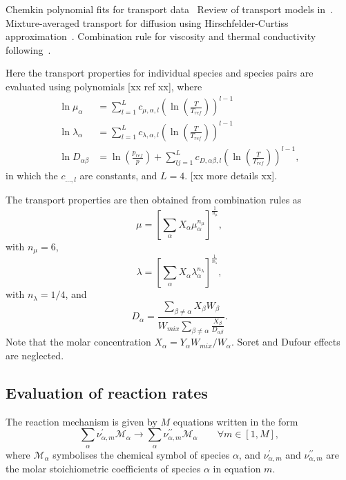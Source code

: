 \documentclass[notitlepage]{revtex4-1}
\begin{document}
Chemkin polynomial fits for transport data~\cite{kee_1986}
Review of transport models in~\cite{giacomazzi_2008}.
Mixture-averaged transport for diffusion using Hirschfelder-Curtiss approximation~\cite{hirschfelder_curtiss}.
Combination rule for viscosity and thermal conductivity following~\cite{ern_1994,ern_1995}.

Here the transport properties for individual species and species pairs are evaluated using polynomials [xx ref xx], where
\begin{subequations}\begin{align}
\ln\mu_{\alpha}&=\displaystyle\sum_{l=1}^{L}c_{\mu,\alpha,l}\left(\ln\left(\frac{T}{T_{ref}}\right)\right)^{l-1}\\
\ln\lambda_{\alpha}&=\displaystyle\sum_{l=1}^{L}c_{\lambda,\alpha,l}\left(\ln\left(\frac{T}{T_{ref}}\right)\right)^{l-1}\\
\ln{D}_{\alpha\beta}&=\ln\left(\frac{p_{ref}}{p}\right)+\displaystyle\sum_{lj=1}^{L}c_{D,\alpha\beta,l}\left(\ln\left(\frac{T}{T_{ref}}\right)\right)^{l-1},
\end{align}\end{subequations}
in which the $c_{\dots,l}$ are constants, and $L=4$. [xx more details xx].

The transport properties are then obtained from combination rules as
\begin{equation}\mu=\left[\displaystyle\sum_{\alpha}X_{\alpha}\mu_{\alpha}^{n_{\mu}}\right]^{\frac{1}{n_{\mu}}},\end{equation}
with $n_{\mu}=6$, 
\begin{equation}\lambda=\left[\displaystyle\sum_{\alpha}X_{\alpha}\lambda_{\alpha}^{n_{\lambda}}\right]^{\frac{1}{n_{\lambda}}},\end{equation}
with $n_{\lambda}=1/4$, and
\begin{equation}D_{\alpha}=\frac{\displaystyle\sum_{\beta\ne\alpha}X_{\beta}{W}_{\beta}}{W_{mix}\displaystyle\sum_{\beta\ne\alpha}\frac{X_{\beta}}{D_{\alpha\beta}}}.\end{equation}
Note that the molar concentration $X_{\alpha}=Y_{\alpha}W_{mix}/W_{\alpha}$.
Soret and Dufour effects are neglected.

\subsection{Evaluation of reaction rates}

The reaction mechanism is given by $M$ equations written in the form
\begin{equation}\displaystyle\sum_{\alpha}\nu_{\alpha,m}^{\prime}\mathcal{M}_{\alpha}\rightarrow\displaystyle\sum_{\alpha}\nu_{\alpha,m}^{\prime\prime}\mathcal{M}_{\alpha}\qquad\forall{m}\in\left[1,M\right],\end{equation}
where $\mathcal{M}_{\alpha}$ symbolises the chemical symbol of species $\alpha$, and 
$\nu_{\alpha,m}^{\prime}$ and $\nu_{\alpha,m}^{\prime\prime}$ are the molar stoichiometric coefficients of species $\alpha$ in equation $m$.
\end{document}
